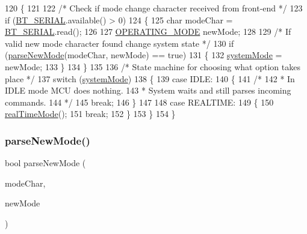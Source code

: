 \begin{DoxyCode}
120 \{
121 
122   \textcolor{comment}{/* Check if mode change character received from front-end */}
123   \textcolor{keywordflow}{if} (\hyperlink{logging-device_8ino_ad1e6e6f6fc813b305067b9e1b0777ea6}{BT\_SERIAL}.available() > 0)
124   \{
125     \textcolor{keywordtype}{char} modeChar = \hyperlink{logging-device_8ino_ad1e6e6f6fc813b305067b9e1b0777ea6}{BT\_SERIAL}.read();
126 
127     \hyperlink{logging-device_8ino_a980e950615d86dadef54f3cfaefb5fb4}{OPERATING\_MODE} newMode;
128 
129     \textcolor{comment}{/* If valid new mode character found change system state */}
130     \textcolor{keywordflow}{if} (\hyperlink{logging-device_8ino_aec1eb39e3cfde6331c4d29938c952c84}{parseNewMode}(modeChar, newMode) == \textcolor{keyword}{true})
131     \{
132       \hyperlink{logging-device_8ino_a13a2ecbcf455940dd240e54e9e39cf7a}{systemMode} = newMode;
133     \}
134   \}
135 
136   \textcolor{comment}{/* State machine for choosing what option takes place */}
137   \textcolor{keywordflow}{switch} (\hyperlink{logging-device_8ino_a13a2ecbcf455940dd240e54e9e39cf7a}{systemMode})
138   \{
139     \textcolor{keywordflow}{case} IDLE:
140     \{
141       \textcolor{comment}{/*}
142 \textcolor{comment}{       * In IDLE mode MCU does nothing.}
143 \textcolor{comment}{       * System waits and still parses incoming commands.}
144 \textcolor{comment}{       */}
145       \textcolor{keywordflow}{break};
146     \}
147 
148     \textcolor{keywordflow}{case} REALTIME:
149     \{
150       \hyperlink{logging-device_8ino_ab4c1c4c0fa047e336f9f4176406a54f1}{realTimeMode}();
151       \textcolor{keywordflow}{break};
152     \}
153   \}
154 \}
\end{DoxyCode}
\mbox{\label{logging-device_8ino_aec1eb39e3cfde6331c4d29938c952c84}} 
\subsubsection{\texorpdfstring{parse\+New\+Mode()}{parseNewMode()}}
{\footnotesize\ttfamily bool parse\+New\+Mode (\begin{DoxyParamCaption}\item[{char}]{mode\+Char,  }\item[{\hyperlink{logging-device_8ino_a980e950615d86dadef54f3cfaefb5fb4}{O\+P\+E\+R\+A\+T\+I\+N\+G\+\_\+\+M\+O\+DE} \&}]{new\+Mode }\end{DoxyParamCaption})}



